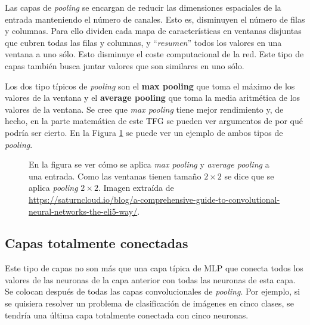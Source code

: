 Las capas de \textit{pooling} se encargan de reducir las dimensiones espaciales de la entrada manteniendo el número de canales. Esto es, disminuyen el número de filas y columnas. Para ello dividen cada mapa de características en ventanas disjuntas que cubren todas las filas y columnas, y ``\textit{resumen}''  todos los valores en una ventana a uno sólo. Esto disminuye el coste computacional de la red. Este tipo de capas también busca juntar valores que son similares en uno sólo.

Los dos tipo típicos de \textit{pooling} son el \textbf{max pooling} que toma el máximo de los valores de la ventana y el \textbf{average pooling} que toma la media aritmética de los valores de la ventana. Se cree que \textit{max pooling} tiene mejor rendimiento y, de hecho, en la parte matemática de este TFG se pueden ver argumentos de por qué podría ser cierto. En la Figura \ref{fig:ejemplo_pooling} se puede ver un ejemplo de ambos tipos de \textit{pooling}.



\begin{figure}[h]
\noindent
{}
\caption{En la figura se ver cómo se aplica \textit{max pooling} y \textit{average pooling} a una entrada. Como las ventanas tienen tamaño $2\times 2$ se dice que se aplica \textit{pooling} $2\times 2$. Imagen extraída de \url{https://saturncloud.io/blog/a-comprehensive-guide-to-convolutional-neural-networks-the-eli5-way/}.}
\label{fig:ejemplo_pooling}
\end{figure}

\subsection*{Capas totalmente conectadas}
Este tipo de capas no son más que una capa típica de MLP que conecta todos los valores de las neuronas de la capa anterior con todas las neuronas de esta capa. Se colocan después de todas las capas convolucionales de \textit{pooling}. Por ejemplo, si se quisiera resolver un problema de clasificación de imágenes en cinco clases, se tendría una última capa totalmente conectada con cinco neuronas.


